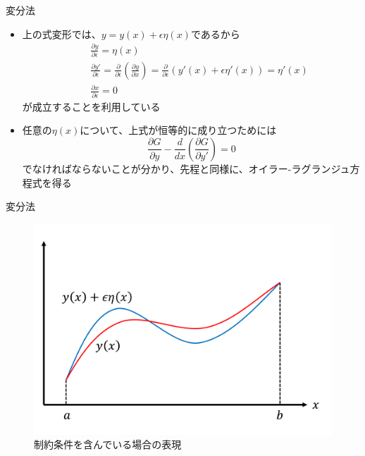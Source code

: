 \documentclass[dvipdfmx,notheorems,t]{beamer}
\begin{document}
\begin{frame}{変分法}
\begin{itemize}
\begin{itemize}
		\item 上の式変形では、$y = y(x) + \epsilon \eta(x)$であるから
		\begin{eqnarray}
			&& \frac{\partial y}{\partial \epsilon} = \eta(x) \\
			&& \frac{\partial y'}{\partial \epsilon} = \frac{\partial}{\partial \epsilon} \left( \frac{\partial y}{\partial x} \right) = \frac{\partial}{\partial \epsilon} \left( y'(x) + \epsilon \eta'(x) \right) = \eta'(x) \\
			&& \frac{\partial x}{\partial \epsilon} = 0
		\end{eqnarray}
		が成立することを利用している
		\newline
		
		\item 任意の$\eta(x)$について、上式が恒等的に成り立つためには
		\begin{equation}
			\frac{\partial G}{\partial y} - \frac{d}{dx} \left( \frac{\partial G}{\partial y'} \right) = 0
		\end{equation}
		でなければならないことが分かり、先程と同様に、オイラー-ラグランジュ方程式を得る
	\end{itemize}
\end{itemize}

\end{frame}

\begin{frame}{変分法}

\begin{figure}[h]
	\centering
	\includegraphics[scale=0.28]{functional-derivative-2.pdf}
	\caption{制約条件を含んでいる場合の表現}
	\label{fig:function-derivative-example-2}
\end{figure}

\end{frame}
\end{document}

